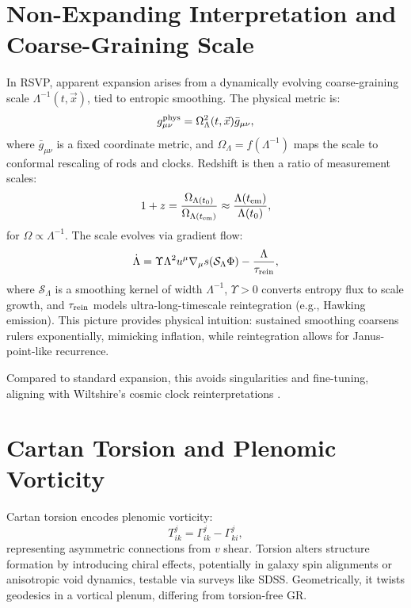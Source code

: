 \documentclass[12pt, a4paper, openany]{book}
\theoremstyle{definition}
\begin{document}
\section{Non-Expanding Interpretation and Coarse-Graining Scale}
In RSVP, apparent expansion arises from a dynamically evolving coarse-graining scale $\Lambda^{-1}(t,\vec{x})$, tied to entropic smoothing. The physical metric is:
\begin{equation}
g_{\mu\nu}^{\rm phys} = \Omega_\Lambda^2(t,\vec{x}) \bar{g}_{\mu\nu},
\end{equation}
where $\bar{g}_{\mu\nu}$ is a fixed coordinate metric, and $\Omega_\Lambda = f(\Lambda^{-1})$ maps the scale to conformal rescaling of rods and clocks. Redshift is then a ratio of measurement scales:
\begin{equation}
1 + z = \frac{\Omega_{\Lambda(t_0)}}{\Omega_{\Lambda(t_{\rm em})}} \approx \frac{\Lambda(t_{\rm em})}{\Lambda(t_0)},
\end{equation}
for $\Omega \propto \Lambda^{-1}$. The scale evolves via gradient flow:
\begin{equation}
\dot{\Lambda} = \Upsilon \Lambda^2 u^\mu \nabla_\mu s(\mathcal{S}_\Lambda \Phi) - \frac{\Lambda}{\tau_{\rm rein}},
\end{equation}
where $\mathcal{S}_\Lambda$ is a smoothing kernel of width $\Lambda^{-1}$, $\Upsilon > 0$ converts entropy flux to scale growth, and $\tau_{\rm rein}$ models ultra-long-timescale reintegration (e.g., Hawking emission). This picture provides physical intuition: sustained smoothing coarsens rulers exponentially, mimicking inflation, while reintegration allows for Janus-point-like recurrence.

Compared to standard expansion, this avoids singularities and fine-tuning, aligning with Wiltshire's cosmic clock reinterpretations \citep{Wiltshire:2007}.

\section{Cartan Torsion and Plenomic Vorticity}
Cartan torsion encodes plenomic vorticity:
\begin{equation}
T^j_{ik} = \Gamma^j_{ik} - \Gamma^j_{ki},
\end{equation}
representing asymmetric connections from $v$ shear. Torsion alters structure formation by introducing chiral effects, potentially in galaxy spin alignments or anisotropic void dynamics, testable via surveys like SDSS. Geometrically, it twists geodesics in a vortical plenum, differing from torsion-free GR.
\end{document}

